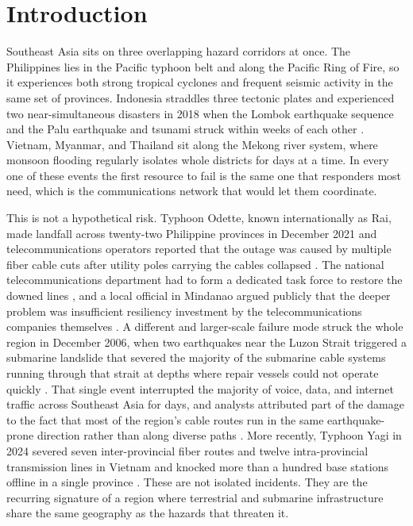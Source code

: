 \documentclass[drones,article,submit,moreauthors]{Definitions/mdpi}
\begin{document}
\section{Introduction}
\label{sec:intro}

Southeast Asia sits on three overlapping hazard corridors at once. The Philippines lies in the Pacific typhoon belt and along the Pacific Ring of Fire, so it experiences both strong tropical cyclones and frequent seismic activity in the same set of provinces. Indonesia straddles three tectonic plates and experienced two near-simultaneous disasters in 2018 when the Lombok earthquake sequence and the Palu earthquake and tsunami struck within weeks of each other \cite{sulawesi2018eq}. Vietnam, Myanmar, and Thailand sit along the Mekong river system, where monsoon flooding regularly isolates whole districts for days at a time. In every one of these events the first resource to fail is the same one that responders most need, which is the communications network that would let them coordinate.

This is not a hypothetical risk. Typhoon Odette, known internationally as Rai, made landfall across twenty-two Philippine provinces in December 2021 and telecommunications operators reported that the outage was caused by multiple fiber cable cuts after utility poles carrying the cables collapsed \cite{odette_telecom_2022}. The national telecommunications department had to form a dedicated task force to restore the downed lines \cite{odette_dict_2021}, and a local official in Mindanao argued publicly that the deeper problem was insufficient resiliency investment by the telecommunications companies themselves \cite{mindanao_resiliency_2021}. A different and larger-scale failure mode struck the whole region in December 2006, when two earthquakes near the Luzon Strait triggered a submarine landslide that severed the majority of the submarine cable systems running through that strait at depths where repair vessels could not operate quickly \cite{luzon_cable_2006,nanog_taiwan_cable}. That single event interrupted the majority of voice, data, and internet traffic across Southeast Asia for days, and analysts attributed part of the damage to the fact that most of the region's cable routes run in the same earthquake-prone direction rather than along diverse paths \cite{sulawesi_cable_risk}. More recently, Typhoon Yagi in 2024 severed seven inter-provincial fiber routes and twelve intra-provincial transmission lines in Vietnam and knocked more than a hundred base stations offline in a single province \cite{yagi_vietnam_2024}. These are not isolated incidents. They are the recurring signature of a region where terrestrial and submarine infrastructure share the same geography as the hazards that threaten it.
\end{document}
